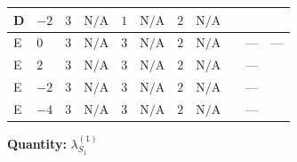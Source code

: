 \documentclass[8pt]{article}
\begin{document}
\begin{landscape}
\begin{longtable}{@{}llcccccc >{\raggedright\arraybackslash}p{0.21\linewidth} >{\raggedright\arraybackslash}p{0.21\linewidth} >{\raggedright\arraybackslash}p{0.21\linewidth}@{}}
\midrule
D & $-2$ & $3$ & $\text{N/A}$ & $1$ & $\text{N/A}$ & $2$ & $\text{N/A}$ & \scriptsize\adjustbox{max width=\linewidth}{$\begin{gathered} +14 {\lambda_{S_1}^{(1)}}^2\end{gathered}$} & \scriptsize\adjustbox{max width=\linewidth}{$\begin{gathered} 8 {\lambda_{X_{7}}^{(1)}} \left({\lambda_{X_{7}}^{(1)}}\right)^{*}\end{gathered}$} & \scriptsize\adjustbox{max width=\linewidth}{$\begin{gathered} +12 {g_1}^4\end{gathered}$} \\
\midrule
E & $0$ & $3$ & $\text{N/A}$ & $3$ & $\text{N/A}$ & $2$ & $\text{N/A}$ & \scriptsize\adjustbox{max width=\linewidth}{$\begin{gathered} +14 {\lambda_{S_1}^{(1)}}^2\end{gathered}$} & --- & --- \\
\midrule
E & $2$ & $3$ & $\text{N/A}$ & $3$ & $\text{N/A}$ & $2$ & $\text{N/A}$ & \scriptsize\adjustbox{max width=\linewidth}{$\begin{gathered} +14 {\lambda_{S_1}^{(1)}}^2\end{gathered}$} & --- & \scriptsize\adjustbox{max width=\linewidth}{$\begin{gathered} +12 {g_1}^4\end{gathered}$} \\
\midrule
E & $-2$ & $3$ & $\text{N/A}$ & $3$ & $\text{N/A}$ & $2$ & $\text{N/A}$ & \scriptsize\adjustbox{max width=\linewidth}{$\begin{gathered} +14 {\lambda_{S_1}^{(1)}}^2\end{gathered}$} & --- & \scriptsize\adjustbox{max width=\linewidth}{$\begin{gathered} +12 {g_1}^4\end{gathered}$} \\
\midrule
E & $-4$ & $3$ & $\text{N/A}$ & $3$ & $\text{N/A}$ & $2$ & $\text{N/A}$ & \scriptsize\adjustbox{max width=\linewidth}{$\begin{gathered} +14 {\lambda_{S_1}^{(1)}}^2\end{gathered}$} & --- & \scriptsize\adjustbox{max width=\linewidth}{$\begin{gathered} +192 {g_1}^4\end{gathered}$} \\
\midrule
\bottomrule
\end{longtable}
\clearpage
\noindent\textbf{Quantity: }$\lambda_{S_1}^{(1)}$\par\smallskip

\end{landscape}
\end{document}
